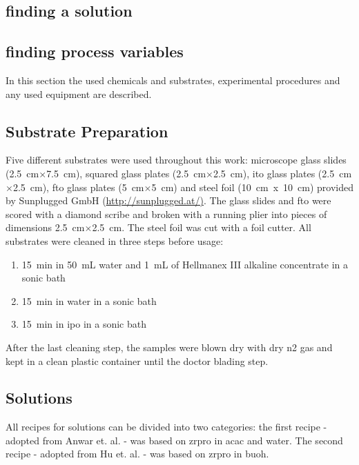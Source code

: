 \documentclass[a4paper]{article}
\newcommand{\td}[1]{\textcolor{red}{#1}}
\newcommand{\ds}[1]{}
\newcommand{\x}{$\times$}
\newcommand{\cm}[1]{\SI{#1}{\centi\meter}}
\newcommand{\ml}[1]{\SI{#1}{\milli\liter}}
\newcommand{\minutes}[1]{\SI{#1}{\minute}}
\begin{document}
\subsection{finding a solution}
\subsection{finding process variables}
In this section the used chemicals and substrates, experimental procedures and any used equipment are described. 
\subsection{Substrate Preparation}
Five different substrates were used throughout this work: 
microscope glass slides (\cm{2.5}\x\cm{7.5})\ds{ from Sigma Aldrich},\ds{ thinner,} squared glass plates (\cm{2.5}\x\cm{2.5})\ds{ from Sigma Aldrich}, \gls{ito} glass plates (\cm{2.5}\x\cm{2.5})\ds{ from Sigma Aldrich}, \gls{fto} glass plates (\cm{5}\x\cm{5})\ds{ from Sigma Aldrich} and steel foil (10~cm~x~10~cm) provided by Sunplugged GmbH (\url{http://sunplugged.at/)}.
The glass slides and \gls{fto} were scored with a diamond scribe \ds{\td{(diamond scratcher/scraper)} }and broken with a running plier into pieces of dimensions \cm{2.5}\x\cm{2.5}.
The steel foil was cut with a foil cutter.
All substrates were cleaned in three steps before usage:
\begin{enumerate}
	\item \minutes{15} in \ml{50} \gls{water} and \ml{1} of Hellmanex III alkaline concentrate in a sonic bath
	\item \minutes{15} in \gls{water} in a sonic bath
	\item \minutes{15} in \gls{ipo} in a sonic bath 
\end{enumerate}
After the last cleaning step, the samples were blown dry with dry \gls{n2} gas and kept in a clean plastic container until the doctor blading step.

\subsection{Solutions}
All recipes for solutions can be divided into two categories:
the first recipe - adopted from Anwar et. al. \cite{Anwar2017} - was based on \gls{zrpro} in \gls{acac} and \gls{water}.
The second recipe - adopted from Hu et. al. \cite{Hu2016} - was based on \gls{zrpro} in \gls{buoh}.
\end{document}
